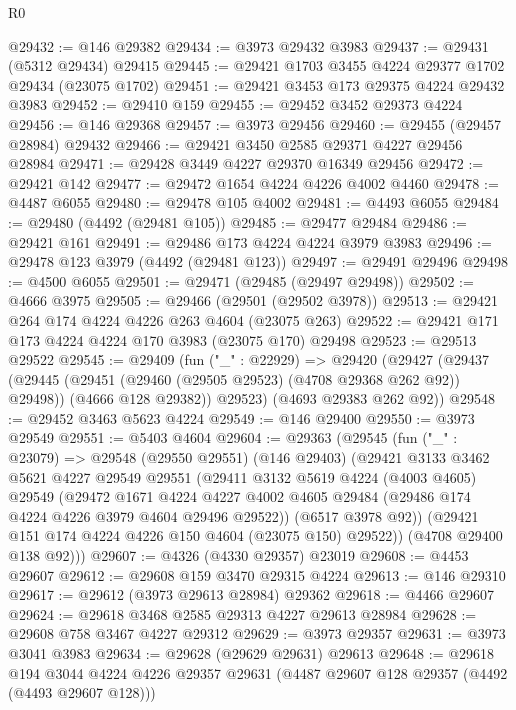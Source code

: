 \begin{lexlean}{R0}
\begin{coremodule}
@29432 := @146 @29382
@29434 := @3973 @29432 @3983
@29437 := @29431 (@5312 @29434) @29415
@29445 := @29421 @1703 @3455 @4224 @29377 @1702 @29434 (@23075 @1702)
@29451 := @29421 @3453 @173 @29375 @4224 @29432 @3983
@29452 := @29410 @159
@29455 := @29452 @3452 @29373 @4224
@29456 := @146 @29368
@29457 := @3973 @29456
@29460 := @29455 (@29457 @28984) @29432
@29466 := @29421 @3450 @2585 @29371 @4227 @29456 @28984
@29471 := @29428 @3449 @4227 @29370 @16349 @29456
@29472 := @29421 @142
@29477 := @29472 @1654 @4224 @4226 @4002 @4460
@29478 := @4487 @6055
@29480 := @29478 @105 @4002
@29481 := @4493 @6055
@29484 := @29480 (@4492 (@29481 @105))
@29485 := @29477 @29484
@29486 := @29421 @161
@29491 := @29486 @173 @4224 @4224 @3979 @3983
@29496 := @29478 @123 @3979 (@4492 (@29481 @123))
@29497 := @29491 @29496
@29498 := @4500 @6055
@29501 := @29471 (@29485 (@29497 @29498))
@29502 := @4666 @3975
@29505 := @29466 (@29501 (@29502 @3978))
@29513 := @29421 @264 @174 @4224 @4226 @263 @4604 (@23075 @263)
@29522 := @29421 @171 @173 @4224 @4224 @170 @3983 (@23075 @170) @29498
@29523 := @29513 @29522
@29545 := @29409
    (fun ("_" : @22929) =>
    @29420
      (@29427
        (@29437
          (@29445 (@29451 (@29460 (@29505 @29523) (@4708 @29368 @262 @92)) @29498))
          (@4666 @128 @29382))
        @29523)
      (@4693 @29383 @262 @92))
@29548 := @29452 @3463 @5623 @4224
@29549 := @146 @29400
@29550 := @3973 @29549
@29551 := @5403 @4604
@29604 := @29363
    (@29545
      (fun ("_" : @23079) =>
      @29548
        (@29550 @29551)
        (@146 @29403)
        (@29421
          @3133
          @3462
          @5621
          @4227
          @29549
          @29551
          (@29411
            @3132
            @5619
            @4224
            (@4003 @4605)
            @29549
            (@29472
              @1671
              @4224
              @4227
              @4002
              @4605
              @29484
              (@29486 @174 @4224 @4226 @3979 @4604 @29496 @29522))
            (@6517 @3978 @92))
          (@29421 @151 @174 @4224 @4226 @150 @4604 (@23075 @150) @29522))
        (@4708 @29400 @138 @92)))
@29607 := @4326 (@4330 @29357) @23019
@29608 := @4453 @29607
@29612 := @29608 @159 @3470 @29315 @4224
@29613 := @146 @29310
@29617 := @29612 (@3973 @29613 @28984) @29362
@29618 := @4466 @29607
@29624 := @29618 @3468 @2585 @29313 @4227 @29613 @28984
@29628 := @29608 @758 @3467 @4227 @29312
@29629 := @3973 @29357
@29631 := @3973 @3041 @3983
@29634 := @29628 (@29629 @29631) @29613
@29648 := @29618
    @194
    @3044
    @4224
    @4226
    @29357
    @29631
    (@4487 @29607 @128 @29357 (@4492 (@4493 @29607 @128)))

\end{coremodule}
\end{lexlean}
